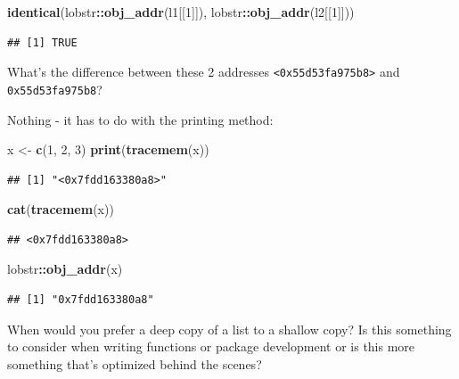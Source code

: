 \documentclass[]{book}
\newenvironment{Shaded}{\begin{snugshade}}{\end{snugshade}}
\newcommand{\DecValTok}[1]{\textcolor[rgb]{0.00,0.00,0.81}{#1}}
\newcommand{\KeywordTok}[1]{\textcolor[rgb]{0.13,0.29,0.53}{\textbf{#1}}}
\newcommand{\NormalTok}[1]{#1}
\newcommand{\OperatorTok}[1]{\textcolor[rgb]{0.81,0.36,0.00}{\textbf{#1}}}
\newcommand{\StringTok}[1]{\textcolor[rgb]{0.31,0.60,0.02}{#1}}
\begin{document}
\begin{Shaded}
\begin{Highlighting}[]
\KeywordTok{identical}\NormalTok{(lobstr}\OperatorTok{::}\KeywordTok{obj_addr}\NormalTok{(l1[[}\DecValTok{1}\NormalTok{]]), lobstr}\OperatorTok{::}\KeywordTok{obj_addr}\NormalTok{(l2[[}\DecValTok{1}\NormalTok{]]))}
\end{Highlighting}
\end{Shaded}

\begin{verbatim}
## [1] TRUE
\end{verbatim}

What's the difference between these 2 addresses \texttt{\textless{}0x55d53fa975b8\textgreater{}} and \texttt{0x55d53fa975b8}?

Nothing - it has to do with the printing method:

\begin{Shaded}
\begin{Highlighting}[]
\NormalTok{x <-}\StringTok{ }\KeywordTok{c}\NormalTok{(}\DecValTok{1}\NormalTok{, }\DecValTok{2}\NormalTok{, }\DecValTok{3}\NormalTok{)}
\KeywordTok{print}\NormalTok{(}\KeywordTok{tracemem}\NormalTok{(x))}
\end{Highlighting}
\end{Shaded}

\begin{verbatim}
## [1] "<0x7fdd163380a8>"
\end{verbatim}

\begin{Shaded}
\begin{Highlighting}[]
\KeywordTok{cat}\NormalTok{(}\KeywordTok{tracemem}\NormalTok{(x))}
\end{Highlighting}
\end{Shaded}

\begin{verbatim}
## <0x7fdd163380a8>
\end{verbatim}

\begin{Shaded}
\begin{Highlighting}[]
\NormalTok{lobstr}\OperatorTok{::}\KeywordTok{obj_addr}\NormalTok{(x)}
\end{Highlighting}
\end{Shaded}

\begin{verbatim}
## [1] "0x7fdd163380a8"
\end{verbatim}

When would you prefer a deep copy of a list to a shallow copy? Is this something to consider when writing functions or package development or is this more something that's optimized behind the scenes?
\end{document}

